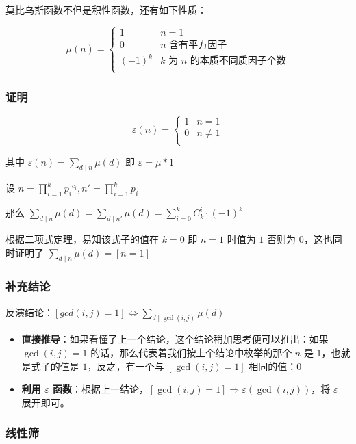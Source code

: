 莫比乌斯函数不但是积性函数，还有如下性质：

$$
\mu(n)=
\begin{cases}
1&n=1\\
0&n\text{ 含有平方因子}\\
(-1)^k&k\text{ 为 }n\text{ 的本质不同质因子个数}\\
\end{cases}
$$

\subsubsection{证明}

$$
\varepsilon(n)=
\begin{cases}
1&n=1\\
0&n\neq 1\\
\end{cases}
$$

其中 $\displaystyle\varepsilon(n)=\sum_{d\mid n}\mu(d)$ 即 $\varepsilon=\mu*1$

设 $\displaystyle n=\prod_{i=1}^k{p_i}^{c_i},n'=\prod_{i=1}^k p_i$

那么 $\displaystyle\sum_{d\mid n}\mu(d)=\sum_{d\mid n'}\mu(d)=\sum_{i=0}^k C_k^i\cdot(-1)^k$

根据二项式定理，易知该式子的值在 $k=0$ 即 $n=1$ 时值为 $1$ 否则为 $0$，这也同时证明了 $\displaystyle\sum_{d\mid n}\mu(d)=[n=1]$

\subsubsection{补充结论}

反演结论：$\displaystyle [gcd(i,j)=1] \Leftrightarrow\sum_{d\mid\gcd(i,j)}\mu(d)$

\begin{itemize}
\item \textbf{直接推导}：如果看懂了上一个结论，这个结论稍加思考便可以推出：如果 $\gcd(i,j)=1$ 的话，那么代表着我们按上个结论中枚举的那个 $n$ 是 $1$，也就是式子的值是 $1$，反之，有一个与 $[\gcd(i,j)=1]$ 相同的值：$0$
\item \textbf{利用 $\varepsilon$ 函数}：根据上一结论，$[\gcd(i,j)=1]\Rightarrow \varepsilon(\gcd(i,j))$，将 $\varepsilon$ 展开即可。
\end{itemize}

\subsubsection{线性筛}

